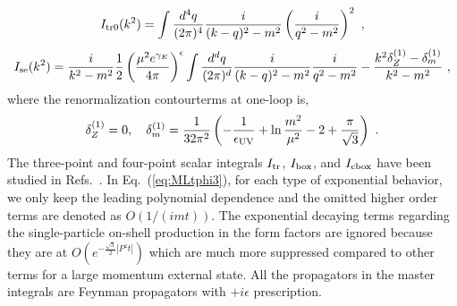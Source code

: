 \documentclass[a4paper,11pt]{article}
\begin{document}
\begin{align}\label{eq:Itr0}
I_{\rm tr0}(k^2) = \int \frac{d^4 q}{(2\pi)^4} \frac{i}{(k-q)^2-m^2} \left(\frac{i}{q^2-m^2}\right)^2  \ ,
\end{align}
\begin{align}\label{eq:Isedef}
I_{\rm se}(k^2) = \frac{i}{k^2-m^2} \frac{1}{2} \left( \frac{\mu^2 e^{\gamma_E}}{4\pi} \right)^{\epsilon} \int \frac{d^d q}{(2\pi)^d} \frac{i}{(k-q)^2-m^2} \frac{i}{q^2-m^2} - \frac{k^2 \delta^{(1)}_Z-\delta^{(1)}_m}{k^2-m^2} \ ,
\end{align}
where the renormalization contourterms at one-loop is,
\begin{align}
\delta^{(1)}_Z = 0, \quad
\delta^{(1)}_{m} = \frac{1}{32\pi^2} \left(- \frac{1}{\epsilon_{\rm UV}} + \ln\frac{m^2}{\mu^2} - 2 + \frac{\pi}{\sqrt{3}}\right) \ .
\end{align}
The three-point and four-point scalar integrals $I_{\rm tr}$, $I_{\rm box}$, and $I_{\rm cbox}$ have been studied in Refs.~\cite{THOOFT1979365,DENNER1991637,Denner:1991kt,Denner:2010tr}. In Eq.~(\ref{eq:MLtphi3}), for each type of exponential behavior, we only keep the leading polynomial dependence and the omitted higher order terms are denoted as $O\left(1/(imt)\right)$. The exponential decaying terms regarding the single-particle on-shell production in the form factors are ignored because they are at $O\left(e^{-\frac{\sqrt{3}}{2} |P^z t|}\right)$ which are much more suppressed compared to other terms for a large momentum external state. All the propagators in the master integrals are Feynman propagators with $+ i \epsilon $ prescription. 
\end{document}
